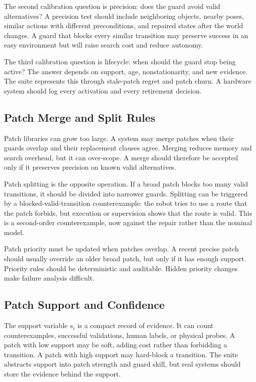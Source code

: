 \documentclass{article}
\begin{document}
The second calibration question is precision: does the guard avoid valid
alternatives? A precision test should include neighboring objects, nearby
poses, similar actions with different preconditions, and repaired states after
the world changes. A guard that blocks every similar transition may preserve
success in an easy environment but will raise search cost and reduce autonomy.

The third calibration question is lifecycle: when should the guard stop being
active? The answer depends on support, age, nonstationarity, and new evidence.
The suite represents this through stale-patch regret and patch churn. A
hardware system should log every activation and every retirement decision.

\subsection{Patch Merge and Split Rules}

Patch libraries can grow too large. A system may merge patches when their guards
overlap and their replacement clauses agree. Merging reduces memory and search
overhead, but it can over-scope. A merge should therefore be accepted only if it
preserves precision on known valid alternatives.

Patch splitting is the opposite operation. If a broad patch blocks too many
valid transitions, it should be divided into narrower guards. Splitting can be
triggered by a blocked-valid-transition counterexample: the robot tries to use
a route that the patch forbids, but execution or supervision shows that the
route is valid. This is a second-order counterexample, now against the repair
rather than the nominal model.

Patch priority must be updated when patches overlap. A recent precise patch
should usually override an older broad patch, but only if it has enough support.
Priority rules should be deterministic and auditable. Hidden priority changes
make failure analysis difficult.

\subsection{Patch Support and Confidence}

The support variable $s_i$ is a compact record of evidence. It can count
counterexamples, successful validations, human labels, or physical probes. A
patch with low support may be soft, adding cost rather than forbidding a
transition. A patch with high support may hard-block a transition. The suite
abstracts support into patch strength and guard skill, but real systems should
store the evidence behind the support.
\end{document}
